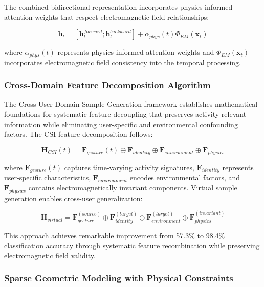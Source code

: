 \documentclass[journal]{IEEEtran}
\begin{document}
The combined bidirectional representation incorporates physics-informed attention weights that respect electromagnetic field relationships:

\begin{equation}
\mathbf{h}_t = [\mathbf{h}_t^{forward}; \mathbf{h}_t^{backward}] + \alpha_{phys}(t) \Phi_{EM}(\mathbf{x}_t)
\label{eq:ablstm_physics_combined}
\end{equation}

where $\alpha_{phys}(t)$ represents physics-informed attention weights and $\Phi_{EM}(\mathbf{x}_t)$ incorporates electromagnetic field consistency into the temporal processing.

\subsubsection{Cross-Domain Feature Decomposition Algorithm}

The Cross-User Domain Sample Generation framework \cite{wang2024feature} establishes mathematical foundations for systematic feature decoupling that preserves activity-relevant information while eliminating user-specific and environmental confounding factors. The CSI feature decomposition follows:

\begin{equation}
\mathbf{H}_{CSI}(t) = \mathbf{F}_{gesture}(t) \oplus \mathbf{F}_{identity} \oplus \mathbf{F}_{environment} \oplus \mathbf{F}_{physics}
\label{eq:feature_decomposition}
\end{equation}

where $\mathbf{F}_{gesture}(t)$ captures time-varying activity signatures, $\mathbf{F}_{identity}$ represents user-specific characteristics, $\mathbf{F}_{environment}$ encodes environmental factors, and $\mathbf{F}_{physics}$ contains electromagnetically invariant components. Virtual sample generation enables cross-user generalization:

\begin{equation}
\mathbf{H}_{virtual} = \mathbf{F}_{gesture}^{(source)} \oplus \mathbf{F}_{identity}^{(target)} \oplus \mathbf{F}_{environment}^{(target)} \oplus \mathbf{F}_{physics}^{(invariant)}
\label{eq:virtual_sample_generation}
\end{equation}

This approach achieves remarkable improvement from 57.3\% to 98.4\% classification accuracy through systematic feature recombination while preserving electromagnetic field validity.

\subsubsection{Sparse Geometric Modeling with Physical Constraints}
\end{document}
